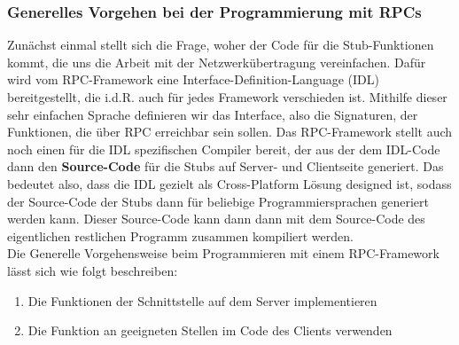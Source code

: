 \subsubsection{Generelles Vorgehen bei der Programmierung mit RPCs}
Zunächst einmal stellt sich die Frage, woher der Code für die Stub-Funktionen kommt, die uns die Arbeit mit der Netzwerkübertragung vereinfachen. Dafür wird vom RPC-Framework eine Interface-Definition-Language (IDL) bereitgestellt, die i.d.R. auch für jedes Framework verschieden ist. Mithilfe dieser sehr einfachen Sprache definieren wir das Interface, also die Signaturen, der Funktionen, die über RPC erreichbar sein sollen. Das RPC-Framework stellt auch noch einen für die IDL spezifischen Compiler bereit, der aus der dem IDL-Code dann den \textbf{Source-Code} für die Stubs auf Server- und Clientseite generiert.
Das bedeutet also, dass die IDL gezielt als Cross-Platform Lösung designed ist, sodass der Source-Code der Stubs dann für beliebige Programmiersprachen generiert werden kann. Dieser Source-Code kann dann dann mit dem Source-Code des eigentlichen restlichen Programm zusammen kompiliert werden.\\

Die Generelle Vorgehensweise beim Programmieren mit einem RPC-Framework lässt sich wie folgt beschreiben:
\begin{enumerate}
    \item Die Funktionen der Schnittstelle auf dem Server implementieren
    \item Die Funktion an geeigneten Stellen im Code des Clients verwenden
\end{enumerate}

